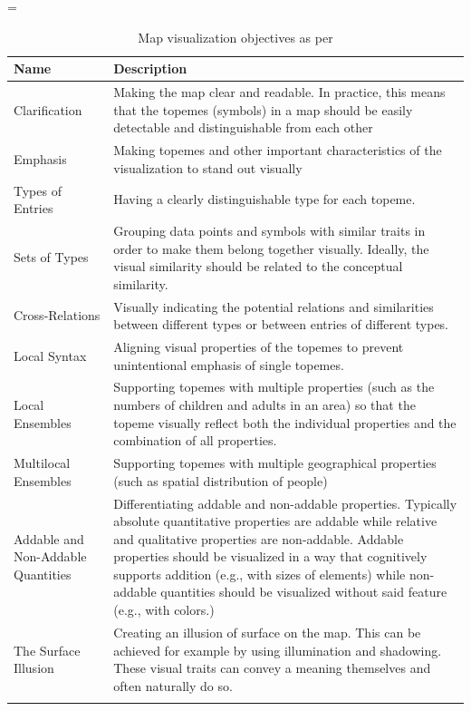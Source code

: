 \LTcapwidth=\textwidth
\begin{longtable}{|p{3cm}|p{10cm}|}
\hline
\textbf{Name} & \textbf{Description} \\ 
\hline
\endhead
\hline
\endfoot
\endlastfoot
Clarification & Making the map clear and readable. In practice, this means that the topemes (symbols) in a map should be easily detectable and distinguishable from each other \\[0.5em]
Emphasis & Making topemes and other important characteristics of the visualization to stand out visually \\[0.5em]
Types of Entries & Having a clearly distinguishable type for each topeme. \\[0.5em]
Sets of Types & Grouping data points and symbols with similar traits in order to make them belong together visually. Ideally, the visual similarity should be related to the conceptual similarity. \\[0.5em]
Cross-Relations & Visually indicating the potential relations and similarities between different types or between entries of different types. \\[0.5em]
Local Syntax & Aligning visual properties of the topemes to prevent unintentional emphasis of single topemes. \\[0.5em]
Local Ensembles & Supporting topemes with multiple properties (such as the numbers of children and adults in an area) so that the topeme visually reflect both the individual properties and the combination of all properties. \\[0.5em]
Multilocal Ensembles & Supporting topemes with multiple geographical properties (such as spatial distribution of people)  \\[0.5em]
Addable and Non-Addable Quantities & Differentiating addable and non-addable properties. Typically absolute quantitative properties are addable while relative and qualitative properties are non-addable. Addable properties should be visualized in a way that cognitively supports addition (e.g., with sizes of elements) while non-addable quantities should be visualized without said feature (e.g., with colors.) \\[0.5em]
The Surface Illusion & Creating an illusion of surface on the map. This can be achieved for example by using illumination and shadowing. These visual traits can convey a meaning themselves and often naturally do so. \\
\hline
\caption{Map visualization objectives as per \citet{schlichtmann_visualization_2002}}
\label{table:geovisualizationobjectives}
\end{longtable}


